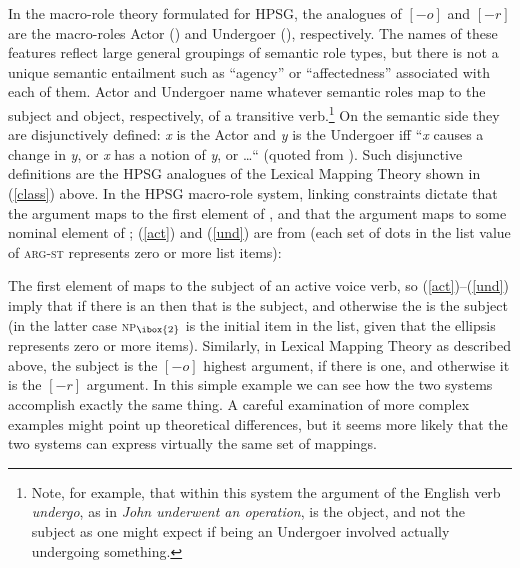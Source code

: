 \noindent
In the macro-role theory formulated for HPSG, the analogues of $[-o]$ and $[-r]$ are the macro-roles Actor () and Undergoer (), respectively.  The names of these features reflect large general groupings of semantic role types, but there is not a unique semantic entailment such as ``agency'' or ``affectedness'' associated with each of them.  Actor  and Undergoer  name whatever semantic roles map to the subject and object, respectively, of a transitive verb.\footnote{Note, for example, that within this system the  argument of the English verb \textit{undergo}, as in \textit{John underwent an operation}, is the object, and not the subject as one might expect if being an Undergoer involved actually undergoing something.}  On the semantic side they are disjunctively defined: \textit{x} is the Actor and \textit{y} is the Undergoer iff ``\textit{x} causes a change in \textit{y}, or \textit{x} has a notion of \textit{y}, or \ldots `` (quoted from \crossrefchapteralt[\pageref{def-act-und-rel}]{arg-st}).  Such disjunctive definitions are the HPSG analogues of the Lexical Mapping Theory  shown in (\ref{class}) above.   In the HPSG macro-role system, linking constraints dictate that the  argument maps to the first element of , and that the  argument maps to some nominal element of ; (\ref{act}) and (\ref{und}) are from   
(each set of dots in the list value of \textsc{arg-st} represents zero or more list items):

\ea
\label{act}
\z

\ea
\label{und}
\z
The first element of  maps to the subject of an active voice verb, so (\ref{act})--(\ref{und}) imply that if there is an  then that  is the subject, and otherwise the  is the subject (in the latter case \textsc{np}$_{\ibox{2}}$ is the initial item in the list, given that the ellipsis represents zero or more items).  Similarly, in Lexical Mapping Theory as described above, the subject is the $[-o]$ highest argument, if there is one, and otherwise it is the $[-r]$ argument.  In this simple example we can see how the two systems accomplish exactly the same thing.  A careful examination of more complex examples might point up theoretical differences, but it seems more likely that the two systems can express virtually the same set of mappings.  

